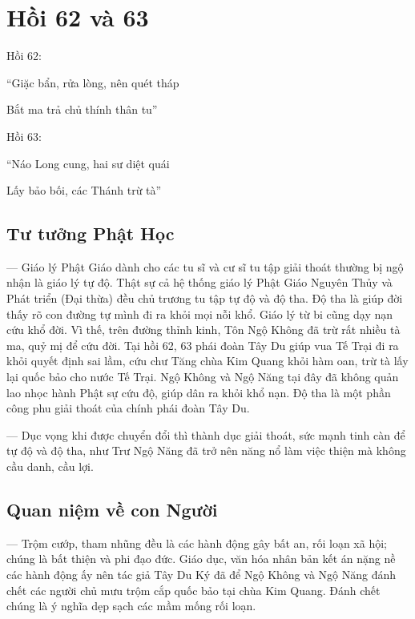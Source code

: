 \chapter{Hồi 62 và 63} %
\label{cha:hoi_62_63}

Hồi 62:

\begin{itshape}
``Giặc bẩn, rửa lòng, nên quét tháp

Bắt ma trả chủ thính thân tu''
\end{itshape}

Hồi 63:

\begin{itshape}
``Náo Long cung, hai sư diệt quái

Lấy bảo bối, các Thánh trừ tà''
\end{itshape}

\section{Tư tưởng Phật Học} %
\label{sec:62_63_phat_hoc}

— Giáo lý Phật Giáo dành cho các tu sĩ và cư sĩ tu tập giải thoát thường bị ngộ nhận là giáo lý tự độ. Thật sự cả hệ thống giáo lý Phật Giáo Nguyên Thủy và Phát triển (Đại thừa) đều chủ trương tu tập tự độ và độ tha. Độ tha là giúp đời thấy rõ con đường tự mình đi ra khỏi mọi nỗi khổ. Giáo lý từ bi cũng dạy nạn cứu khổ đời. Vì thế, trên đường thỉnh kinh, Tôn Ngộ Không đã trừ rất nhiều tà ma, quỷ mị để cứu đời. Tại hồi 62, 63 phái đoàn Tây Du giúp vua Tế Trại đi ra khỏi quyết định sai lầm, cứu chư Tăng chùa Kim Quang khỏi hàm oan, trừ tà lấy lại quốc bảo cho nước Tế Trại. Ngộ Không và Ngộ Năng tại đây đã không quản lao nhọc hành Phật sự cứu độ, giúp dân ra khỏi khổ nạn. Độ tha là một phần công phu giải thoát của chính phái đoàn Tây Du.

— Dục vọng khi được chuyển đổi thì thành dục giải thoát, sức mạnh tinh càn để tự độ và độ tha, như Trư Ngộ Năng đã trở nên năng nổ làm việc thiện mà không cầu danh, cầu lợi.

\section{Quan niệm về con Người} %
\label{sec:62_63_con_nguoi}

— Trộm cướp, tham nhũng đều là các hành động gây bất an, rối loạn xã hội; chúng là bất thiện và phi đạo đức. Giáo dục, văn hóa nhân bản kết án nặng nề các hành động ấy nên tác giả Tây Du Ký đã để Ngộ Không và Ngộ Năng đánh chết các người chủ mưu trộm cắp quốc bảo tại chùa Kim Quang. Đánh chết chúng là ý nghĩa dẹp sạch các mầm mống rối loạn.

